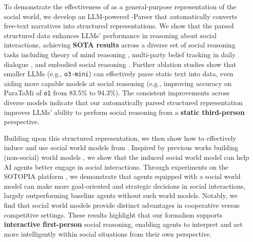 To demonstrate the effectiveness of \protocolname as a general-purpose representation of the social world, we develop an LLM-powered \protocolname-Parser that automatically converts free-text narratives into structured representations.
We show that the parsed structured data enhances LLMs' performance in reasoning about social interactions, achieving \textbf{SOTA results} across a diverse set of social reasoning tasks including theory of mind reasoning \citep{sclar2023mindinglanguagemodelslack}, multi-party belief tracking in daily dialogue \citep{kim-etal-2023-fantom}, and embodied social reasoning
\citep{jin-etal-2024-mmtom}.
Further ablation studies show that smaller LLMs (e.g., \texttt{o3-mini}) can effectively parse static text into \protocolname data, even aiding more capable models at social reasoning (e.g.,  improving accuracy on ParaToMi of \texttt{o1} from 83.5\% to 94.3\%).
The consistent improvements across diverse models indicate that our automatically parsed structured representation improves LLMs' ability to perform social reasoning from a \textbf{static third-person} perspective.



Building upon this structured representation, we then show how to effectively induce and use social world models from \protocolname. 
Inspired by previous works building (non-social) world models \citep{worldmodels2018david, worldmodels2023xiang}, we show that the induced social world model can help AI agents better engage in social interactions.
Through experiments on the SOTOPIA platform \citep{zhou2024sotopia}, we demonstrate that agents equipped with a social world model can make more goal-oriented and strategic decisions in social interactions, largely outperforming baseline agents without such world models.
Notably, we find that social world models provide distinct advantages in cooperative versus competitive settings. These results highlight that our formalism supports \textbf{interactive first-person} social reasoning, enabling agents to interpret and act more intelligently within social situations from their own perspective.


